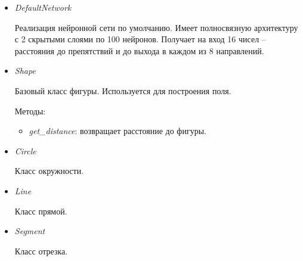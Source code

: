 \documentclass{article}
\begin{document}
\begin{itemize}
    \item \textit{DefaultNetwork}

    Реализация нейронной сети по умолчанию. Имеет полносвязную архитектуру
с 2 скрытыми слоями по 100 нейронов. Получает на вход 16 чисел – расстояния до препятствий и
до выхода в каждом из 8 направлений.

    \item \textit{Shape}

    Базовый класс фигуры. Используется для построения поля.

    Методы:
    \begin{itemize}
        \item \textit{get\_distance}: возвращает расстояние до фигуры.
    \end{itemize}

    \item \textit{Circle}

    Класс окружности.

    \item \textit{Line}

    Класс прямой.

    \item \textit{Segment}

    Класс отрезка.
    
\end{itemize}
\end{document}
